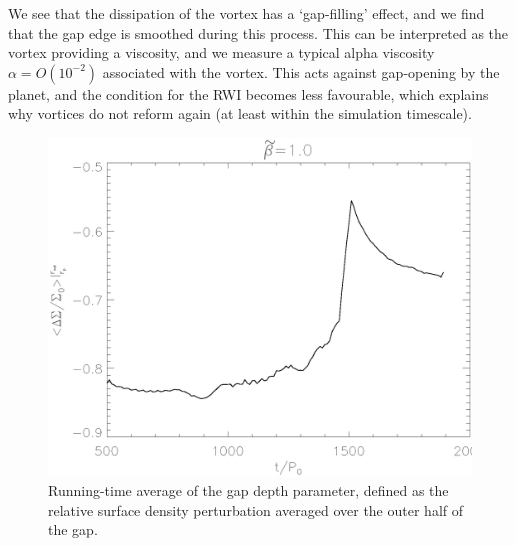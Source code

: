 We see that the dissipation of the vortex has a `gap-filling'
effect, and we find that the gap edge is smoothed during this
process. This can be interpreted as the vortex providing a
viscosity, and we measure a typical alpha viscosity $\alpha = O(10^{-2})$
associated with the vortex. This acts against gap-opening
by the planet, and   
the condition for the RWI
becomes less favourable, which explains why vortices do not
reform again (at least within the simulation timescale).  


\begin{figure}
  \includegraphics[width=\linewidth]{figures/gapdepth}
  \caption{Running-time average of the gap depth parameter, defined as
    the relative surface density perturbation averaged over the
    outer half of the gap.} \label{gapdepth}
\end{figure}

